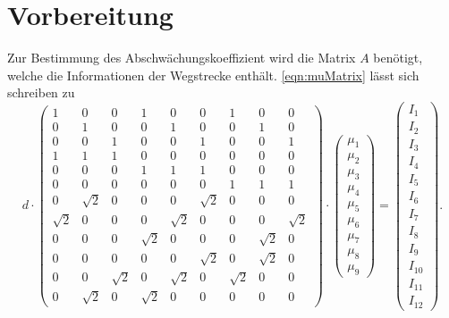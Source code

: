 \section{Vorbereitung}
\label{sec:Vorbereitung}
Zur Bestimmung des Abschwächungskoeffizient wird die Matrix $A$ benötigt, welche die Informationen der Wegstrecke enthält. \autoref{eqn:muMatrix} lässt sich schreiben zu
\begin{equation}
    d \cdot
    \begin{pmatrix}
        1 & 0 & 0 & 1 & 0 & 0 & 1 & 0 & 0 \\
        0 & 1 & 0 & 0 & 1 & 0 & 0 & 1 & 0 \\
        0 & 0 & 1 & 0 & 0 & 1 & 0 & 0 & 1 \\
        1 & 1 & 1 & 0 & 0 & 0 & 0 & 0 & 0 \\
        0 & 0 & 0 & 1 & 1 & 1 & 0 & 0 & 0 \\
        0 & 0 & 0 & 0 & 0 & 0 & 1 & 1 & 1 \\
        0 & \sqrt{2} & 0 & 0 & 0 & \sqrt{2} & 0 & 0 & 0 \\
        \sqrt{2} & 0 & 0 & 0 & \sqrt{2} & 0 & 0 & 0 & \sqrt{2} \\
        0 & 0 & 0 & \sqrt{2} & 0 & 0 & 0 & \sqrt{2} & 0 \\
        0 & 0 & 0 & 0 & 0 & \sqrt{2} & 0 & \sqrt{2} & 0 \\
        0 & 0 & \sqrt{2} & 0 & \sqrt{2} & 0 & \sqrt{2} & 0 & 0 \\
        0 & \sqrt{2} & 0 & \sqrt{2} & 0 & 0 & 0 & 0 & 0 
    \end{pmatrix}
    \cdot
    \begin{pmatrix}
        \mu_1 \\
        \mu_2 \\
        \mu_3 \\
        \mu_4 \\
        \mu_5 \\
        \mu_6 \\
        \mu_7 \\
        \mu_8 \\
        \mu_9 
    \end{pmatrix}
    =
    \begin{pmatrix}
        I_1 \\
        I_2 \\
        I_3 \\
        I_4 \\
        I_5 \\
        I_6 \\
        I_7 \\
        I_8 \\
        I_9 \\
        I_{10} \\
        I_{11} \\
        I_{12} 
    \end{pmatrix}
    .
\end{equation}

